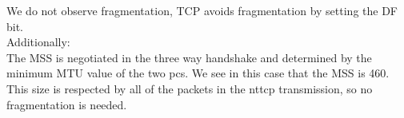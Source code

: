 We do not observe fragmentation, TCP avoids fragmentation by setting the DF bit. \\

Additionally: \\
The MSS is negotiated in the three way handshake and determined by the minimum MTU value of the two pcs. We see in this case that the MSS is 460. \\
This size is respected by all of the packets in the nttcp transmission, so no fragmentation is needed.
